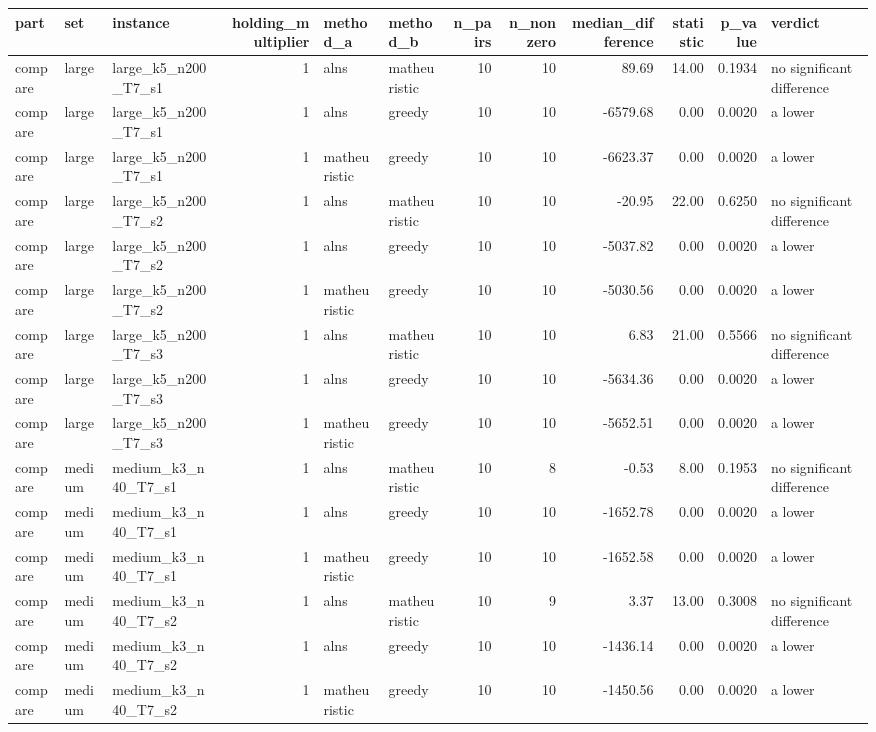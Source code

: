 \begin{tabular}{lllrllrrrrrl}
\toprule
part & set & instance & holding\_multiplier & method\_a & method\_b & n\_pairs & n\_nonzero & median\_difference & statistic & p\_value & verdict \\
\midrule
compare & large & large\_k5\_n200\_T7\_s1 & 1 & alns & matheuristic & 10 & 10 & 89.69 & 14.00 & 0.1934 & no significant difference \\
compare & large & large\_k5\_n200\_T7\_s1 & 1 & alns & greedy & 10 & 10 & -6579.68 & 0.00 & 0.0020 & a lower \\
compare & large & large\_k5\_n200\_T7\_s1 & 1 & matheuristic & greedy & 10 & 10 & -6623.37 & 0.00 & 0.0020 & a lower \\
compare & large & large\_k5\_n200\_T7\_s2 & 1 & alns & matheuristic & 10 & 10 & -20.95 & 22.00 & 0.6250 & no significant difference \\
compare & large & large\_k5\_n200\_T7\_s2 & 1 & alns & greedy & 10 & 10 & -5037.82 & 0.00 & 0.0020 & a lower \\
compare & large & large\_k5\_n200\_T7\_s2 & 1 & matheuristic & greedy & 10 & 10 & -5030.56 & 0.00 & 0.0020 & a lower \\
compare & large & large\_k5\_n200\_T7\_s3 & 1 & alns & matheuristic & 10 & 10 & 6.83 & 21.00 & 0.5566 & no significant difference \\
compare & large & large\_k5\_n200\_T7\_s3 & 1 & alns & greedy & 10 & 10 & -5634.36 & 0.00 & 0.0020 & a lower \\
compare & large & large\_k5\_n200\_T7\_s3 & 1 & matheuristic & greedy & 10 & 10 & -5652.51 & 0.00 & 0.0020 & a lower \\
compare & medium & medium\_k3\_n40\_T7\_s1 & 1 & alns & matheuristic & 10 & 8 & -0.53 & 8.00 & 0.1953 & no significant difference \\
compare & medium & medium\_k3\_n40\_T7\_s1 & 1 & alns & greedy & 10 & 10 & -1652.78 & 0.00 & 0.0020 & a lower \\
compare & medium & medium\_k3\_n40\_T7\_s1 & 1 & matheuristic & greedy & 10 & 10 & -1652.58 & 0.00 & 0.0020 & a lower \\
compare & medium & medium\_k3\_n40\_T7\_s2 & 1 & alns & matheuristic & 10 & 9 & 3.37 & 13.00 & 0.3008 & no significant difference \\
compare & medium & medium\_k3\_n40\_T7\_s2 & 1 & alns & greedy & 10 & 10 & -1436.14 & 0.00 & 0.0020 & a lower \\
compare & medium & medium\_k3\_n40\_T7\_s2 & 1 & matheuristic & greedy & 10 & 10 & -1450.56 & 0.00 & 0.0020 & a lower \\

\end{tabular}
